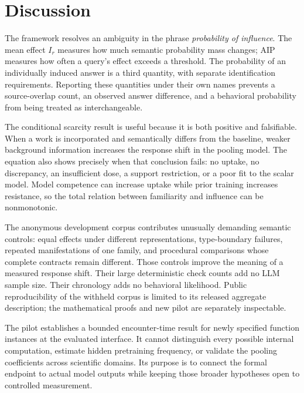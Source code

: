 \documentclass[11pt,letterpaper]{article}
\theoremstyle{definition}\newtheorem{definition}[theorem]{Definition}
\begin{document}
\section{Discussion}
The framework resolves an ambiguity in the phrase \emph{probability of influence}. The mean effect $I_r$ measures how much semantic probability mass changes; AIP measures how often a query's effect exceeds a threshold. The probability of an individually induced answer is a third quantity, with separate identification requirements. Reporting these quantities under their own names prevents a source-overlap count, an observed answer difference, and a behavioral probability from being treated as interchangeable.

The conditional scarcity result is useful because it is both positive and falsifiable. When a work is incorporated and semantically differs from the baseline, weaker background information increases the response shift in the pooling model. The equation also shows precisely when that conclusion fails: no uptake, no discrepancy, an insufficient dose, a support restriction, or a poor fit to the scalar model. Model competence can increase uptake while prior training increases resistance, so the total relation between familiarity and influence can be nonmonotonic.

The anonymous development corpus contributes unusually demanding semantic controls: equal effects under different representations, type-boundary failures, repeated manifestations of one family, and procedural comparisons whose complete contracts remain different. Those controls improve the meaning of a measured response shift. Their large deterministic check counts add no LLM sample size. Their chronology adds no behavioral likelihood. Public reproducibility of the withheld corpus is limited to its released aggregate description; the mathematical proofs and new pilot are separately inspectable.

The pilot establishes a bounded encounter-time result for newly specified function instances at the evaluated interface. It cannot distinguish every possible internal computation, estimate hidden pretraining frequency, or validate the pooling coefficients across scientific domains. Its purpose is to connect the formal endpoint to actual model outputs while keeping those broader hypotheses open to controlled measurement.
\end{document}
